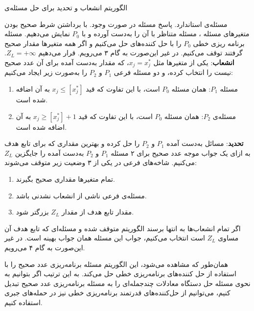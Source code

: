 \renewcommand{\algorithmicrequire}{\textbf{ورودی}}
\renewcommand{\algorithmicensure}{\textbf{خروجی}}
\begin{algorithm}[h]
	\caption{الگوریتم 
		انشعاب و تحدید برای حل مسئله‌ی 
		}
	\label{branch and bound}
	\begin{algorithmic}[1]				
		\REQUIRE مسئله‌ی 
		استاندارد.
		\ENSURE پاسخ مسئله‌  
		در صورت وجود. 
\STATE با برداشتن شرط صحیح بودن متغیرهای مسئله‌  
، 
مسئله‌ 
متناظر با آن را به‌دست  آورده و با 
$P_{0}$
نمایش می‌دهیم.
\STATE مسئله‌  
برنامه ریزی خطی 
$P_{0}$
را با حل کننده‌های 
حل می‌کنیم و اگر همه‌  متغیرها مقدار صحیح گرفتند توقف می‌کنیم. در غیر این‌صورت به گام ۳ می‌رویم.
\STATE قرار می‌دهیم 
$Z_{L} = +\infty$.
\STATE \textbf{انشعاب}: 
یکی از متغیرها مثل 
$x_{j} = x_{j}^{\ast}$، 
که مقدار به‌دست  آمده برای آن عدد صحیح نیست را انتخاب کرده،  و دو مسئله‌  فرعی 
$P_{1}$
و
$P_{2}$
را به‌صورت زیر ایجاد می‌کنیم:
\begin{enumerate}
\item
مسئله‌ 
$P_{1}$: 
همان مسئله‌
$P_{0}$
است، با این تفاوت که قید 
$x_{j}\leq [x_{j}^{\ast}]$
به آن اضافه شده است. 
\item
مسئله‌ی 
$P_{2}$:
 همان مسئله‌ 
 $P_{0}$
 است، با این تفاوت که قید 
$x_{j}\geq [x_{j}^{\ast}] + 1$
به آن اضافه شده است.
\end{enumerate}
\item
\textbf{تحدید}:
مسائل به‌دست آمده 
$P_{1}$
و 
$P_{2}$
را حل کرده و بهترین مقداری که برای تابع هدف به ازای یک جواب موجه عدد صحیح برای ۲ مسئله‌ 
$P_{1}$
و
$P_{2}$
به‌دست آمده را جایگزین 
$Z_{L}$
می‌کنیم.
\STATE شاخه‌های فرعی در یکی از ۳ وضعیت زیر متوقف می‌شوند:
\begin{enumerate}
\item 
تمام متغیرها مقداری صحیح بگیرند. 
\item
مسئله‌ی فرعی ناشی از انشعاب نشدنی باشد. 
\item
مقدار تابع هدف از مقدار 
$Z_{L}$
بزرگتر شود. 
\end{enumerate}
\STATE اگر تمام انشعاب‌ها به انتها برسند الگوریتم  متوقف شده و مسئله‌ای که تابع هدف آن مساوی 
$Z_{L}$
است انتخاب می‌کنیم، جواب این مسئله همان جواب بهینه است. در غیر این‌صورت به گام ۴ می‌رویم.
\end{algorithmic}
\end{algorithm}
همان‌طور که مشاهده می‌شود، این الگوریتم مسئله‌  برنامه‌ریزی عدد صحیح را با استفاده از حل کننده‌های برنامه‌ریزی خطی حل می‌کند. به این ترتیب اگر بتوانیم به نحوی مسئله‌  حل دستگاه معادلات چندجمله‌ای را به مسئله‌  برنامه‌ریزی عدد صحیح تبدیل کنیم، می‌توانیم از حل‌کننده‌های قدرتمند برنامه‌ریزی خطی نیز  در حمله‌های جبری استفاده کنیم. 

